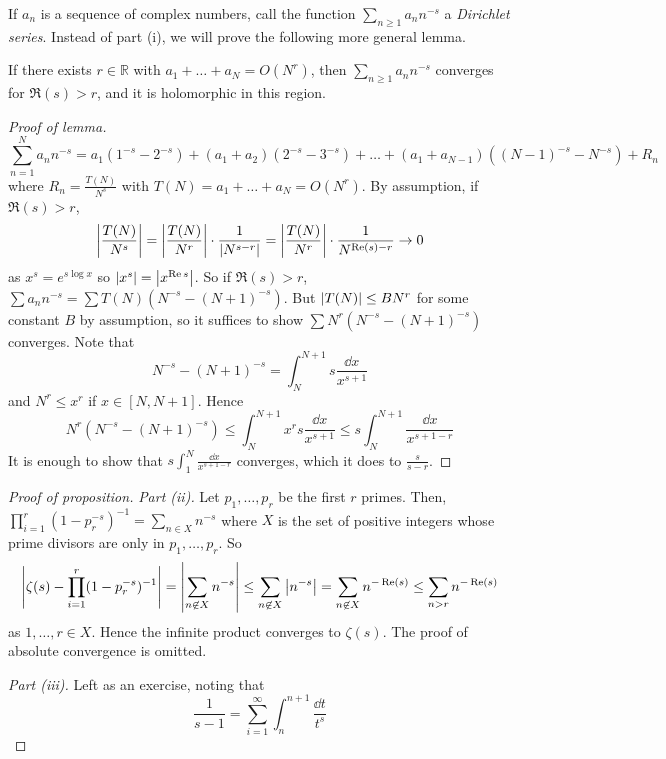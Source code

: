 If \( a_n \) is a sequence of complex numbers, call the function \( \sum_{n \geq 1} a_n n^{-s} \) a \emph{Dirichlet series}.
Instead of part (i), we will prove the following more general lemma.
\begin{lemma}
    If there exists \( r \in \mathbb R \) with \( a_1 + \dots + a_N = O(N^r) \), then \( \sum_{n \geq 1} a_n n^{-s} \) converges for \( \Re(s) > r \), and it is holomorphic in this region.
\end{lemma}
\begin{proof}[Proof of lemma]
    \[ \sum_{n=1}^N a_n n^{-s} = a_1 (1^{-s} - 2^{-s}) + (a_1 + a_2) (2^{-s} - 3^{-s}) + \dots + (a_1 + a_{N-1})((N-1)^{-s} - N^{-s}) + R_n \]
    where \( R_n = \frac{T(N)}{N^s} \) with \( T(N) = a_1 + \dots + a_N = O(N^r) \).
    By assumption, if \( \Re(s) > r \),
    \[ \abs{\frac{T(N)}{N^s}} = \abs{\frac{T(N)}{N^r}} \cdot \frac{1}{\abs{N^{s-r}}} = \abs{\frac{T(N)}{N^r}} \cdot \frac{1}{N^{\operatorname{Re}(s) - r}} \to 0 \]
    as \( x^s = e^{s \log x} \) so \( \abs{x^s} = \abs{x^{\operatorname{Re} s}} \).
    So if \( \Re(s) > r \), \( \sum a_n n^{-s} = \sum T(N) (N^{-s} - (N+1)^{-s}) \).
    But \( \abs{T(N)} \leq BN^r \) for some constant \( B \) by assumption, so it suffices to show \( \sum N^r (N^{-s} - (N+1)^{-s}) \) converges.
    Note that
    \[ N^{-s} - (N+1)^{-s} = \int_N^{N+1} s \frac{\dd{x}}{x^{s+1}} \]
    and \( N^r \leq x^r \) if \( x \in [N, N+1] \).
    Hence
    \[ N^r (N^{-s} - (N+1)^{-s}) \leq \int_N^{N+1} x^r s \frac{\dd{x}}{x^{s+1}} \leq s \int_N^{N+1} \frac{\dd{x}}{x^{s+1-r}} \]
    It is enough to show that \( s\int_1^N \frac{\dd{x}}{x^{s+1-r}} \) converges, which it does to \( \frac{s}{s-r} \).
\end{proof}
\begin{proof}[Proof of proposition]
    \emph{Part (ii).}
    Let \( p_1, \dots, p_r \) be the first \( r \) primes.
    Then, \( \prod_{i=1}^r (1 - p_r^{-s})^{-1} = \sum_{n \in X} n^{-s} \) where \( X \) is the set of positive integers whose prime divisors are only in \( p_1, \dots, p_r \).
    So
    \[ \abs{\zeta(s) - \prod_{i=1}^r (1 - p_r^{-s})^{-1}} = \abs{\sum_{n \not\in X} n^{-s}} \leq \sum_{n \not\in X} \abs{n^{-s}} = \sum_{n \not\in X} n^{-\operatorname{Re}(s)} \leq \sum_{n > r} n^{-\operatorname{Re}(s)} \]
    as \( 1, \dots, r \in X \).
    Hence the infinite product converges to \( \zeta(s) \).
    The proof of absolute convergence is omitted.

    \emph{Part (iii).}
    Left as an exercise, noting that
    \[ \frac{1}{s-1} = \sum_{i=1}^\infty \int_n^{n+1} \frac{\dd{t}}{t^s} \]
\end{proof}

